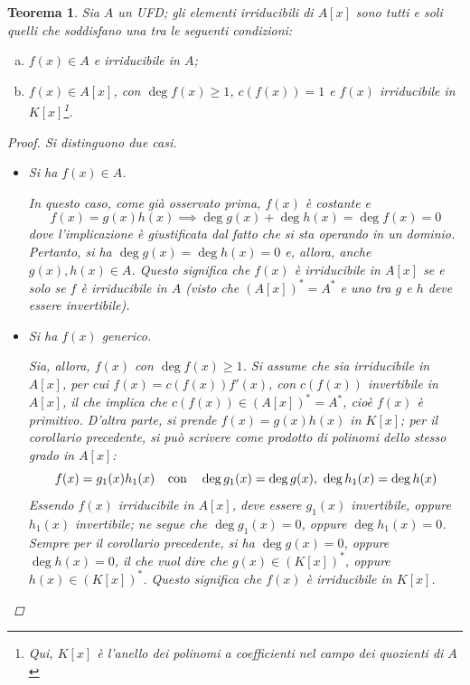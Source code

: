 \documentclass[12pt]{scrartcl}
\theoremstyle{style}
\newtheorem{teorema}{Teorema}[section]
\numberwithin{equation}{subsection}
\begin{document}
\begin{teorema}
	Sia $A$ un UFD; gli elementi irriducibili di $A[x]$ sono tutti e soli quelli che soddisfano una tra le seguenti condizioni:
	\begin{enumerate}[(a).]
		\item $f(x) \in A$ e irriducibile in $A$;
		\item $f(x) \in A[x]$, con $\operatorname{deg} f(x) \ge 1$, $c(f(x)) = 1$ e $f(x)$ irriducibile in $K[x]$\footnote{Qui, $K[x]$ \`e l'anello dei polinomi a coefficienti nel campo dei quozienti di $A$}.
	\end{enumerate}
			\begin{proof}
				Si distinguono due casi.	
				\begin{itemize}
					\item Si ha $f(x) \in A$.

						In questo caso, come gi\`a osservato prima, $f(x)$ \`e costante e 
						\[
						f(x) = g(x) h(x) \implies \operatorname{deg} g(x) + \operatorname{deg} h(x) = \operatorname{deg} f(x) = 0 
						\] 
						dove l'implicazione \`e giustificata dal fatto che si sta operando in un dominio.
						Pertanto, si ha $\operatorname{deg} g(x) = \operatorname{deg} h(x) = 0$ e, allora, anche $g(x) ,h(x) \in A$.
						Questo significa che $f(x)$ \`e irriducibile in $A[x]$ se e solo se $f$ \`e irriducibile in $A$ (visto che $(A[x])^* = A^*$ e uno tra $g$ e $h$ deve essere invertibile).
					\item Si ha $f(x)$ generico.

						Sia, allora, $f(x)$ con $\operatorname{deg} f(x) \ge 1$.
						Si assume che sia irriducibile in $A[x]$, per cui $f(x) = c(f(x)) f'(x)$, con $c(f(x))$ invertibile in $A[x]$, il che implica che $c(f(x)) \in (A[x])^* = A^*$, cio\`e $f(x)$ \`e primitivo.
						D'altra parte, si prende $f(x) = g(x) h(x)$ in $K[x]$; per il corollario precedente, si pu\`o scrivere come prodotto di polinomi dello stesso grado in $A[x]$:
						\[
						f(x) = g_1(x) h_1(x) \hspace{.25cm}  \text{ con  } \hspace{.25cm} \operatorname{deg} g_1(x) = \operatorname{deg} g(x) , \ \operatorname{deg} h_1(x) = \operatorname{deg} h(x)
						\] 
						Essendo $f(x)$ irriducibile in $A[x]$, deve essere $g_1(x)$ invertibile, oppure $h_1(x)$ invertibile; ne segue che $\operatorname{deg} g_1(x) = 0$, oppure $\operatorname{deg} h_1(x) = 0$.
						Sempre per il corollario precedente, si ha $\operatorname{deg} g(x) = 0 $, oppure $\operatorname{deg} h(x) = 0$, il che vuol dire che $g(x) \in (K[x])^*$, oppure $h(x) \in (K[x])^*$. 
						Questo significa che $f(x)$ \`e irriducibile in $K[x]$.


\end{itemize}
\end{proof}
\end{teorema}
\end{document}

